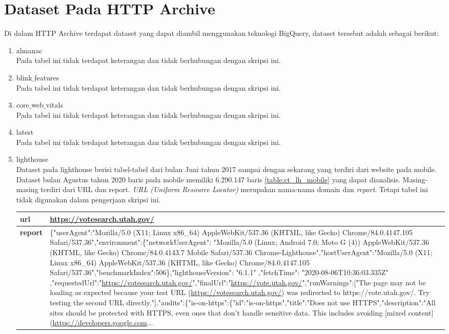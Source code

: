 \section{Dataset Pada HTTP Archive}
Di dalam HTTP Archive terdapat dataset yang dapat diambil menggunakan teknologi BigQuery, dataset tersebut adalah sebagai berikut:
\begin{enumerate}
	\item almanac\\
	Pada tabel ini tidak terdapat keterangan dan tidak berhubungan dengan skripsi ini.
	\item blink$\_$features\\
	Pada tabel ini tidak terdapat keterangan dan tidak berhubungan dengan skripsi ini.
	\item core$\_$web$\_$vitals\\
	Pada tabel ini tidak terdapat keterangan dan tidak berhubungan dengan skripsi ini.
	\item latest\\
	Pada tabel ini tidak terdapat keterangan dan tidak berhubungan dengan skripsi ini.
	\item lighthouse\\
	Dataset pada lighthouse berisi tabel-tabel dari bulan Juni tahun 2017 sampai dengan sekarang yang terdiri dari website pada mobile. Dataset bulan Agustus tahun 2020 baris pada mobile memiliki 6.290.147 baris \ref{table:ct_lh_mobile} yang dapat dianalisis. Masing-masing terdiri dari URL dan report. \textit{URL (Uniform Resource Locator)} merupakan nama-nama domain dan \textit{report}. Tetapi tabel ini tidak digunakan dalam pengerjaan skripsi ini. 
	
	
	\begin{table}[H]
		\centering
		\begin{tabular*}{\textwidth}{|l|p{14.4cm}|}
			\hline
			\textbf{url} & \url{https://votesearch.utah.gov/}\\ 
			\hline
			\textbf{report} & \{"userAgent":"Mozilla/5.0 (X11; Linux x86\_64) AppleWebKit/537.36 (KHTML, like Gecko) Chrome/84.0.4147.105 Safari/537.36","environment":\{"networkUserAgent": "Mozilla/5.0 (Linux; Android 7.0; Moto G (4)) AppleWebKit/537.36 (KHTML, like Gecko) Chrome/84.0.4143.7 Mobile Safari/537.36 Chrome-Lighthouse","hostUserAgent":"Mozilla/5.0 (X11; Linux x86\_64) AppleWebKit/537.36 (KHTML, like Gecko) Chrome/84.0.4147.105 Safari/537.36","benchmarkIndex":506\},"lighthouseVersion": "6.1.1" ,"fetchTime": "2020-08-06T10:36:03.335Z" ,"requestedUrl":"\url{https://votesearch.utah.gov/}","finalUrl":"\url{https://vote.utah.gov/}","runWarnings":["The page may not be loading as expected because your test URL (\url{https://votesearch.utah.gov/}) was redirected to https://vote.utah.gov/. Try testing the second URL directly."],"audits":\{"is-on-https":\{"id":"is-on-https","title":"Does not use HTTPS","description":"All sites should be protected with HTTPS, even ones that don't handle sensitive data. This includes avoiding [mixed content](\url{https://developers.google.com}...\\
			\hline
			

\end{tabular*}
\end{table}
\end{enumerate}
